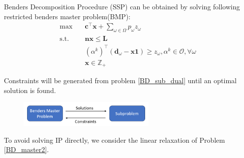 \begin{frame}{Benders Decomposition Procedure}
  \small
  (SSP) can be obtained by solving following restricted benders master problem(BMP):
  \begin{equation}\label{BD_master2}
    \begin{aligned}
      \max \quad & \mathbf{c}^{\intercal} \mathbf{x} + \sum_{\omega \in \Omega} p_{\omega} z_{\omega} \\
      \text {s.t.} \quad & \mathbf{n} \mathbf{x} \leq \mathbf{L} \\
      & (\alpha^{k})^{\intercal}(\mathbf{d}_{\omega}- \mathbf{x} \mathbf{1}) \geq z_{\omega}, \alpha^k \in \mathcal{O}, \forall \omega \\
       & \mathbf{x} \in \mathbb{Z}_{+}
    \end{aligned}
  \end{equation} 

  Constraints will be generated from problem \eqref{BD_sub_dual} until an optimal solution is found.

  \begin{figure}[ht]
    \centering
    \includegraphics[width = 0.6\textwidth]{./images/BD.png}
  \end{figure}

  To avoid solving IP directly, we consider the linear relaxation of Problem \eqref{BD_master2}.
\end{frame}


